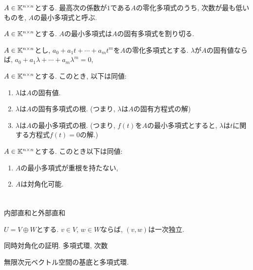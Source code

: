 \begin{definition}
$A\in\mathbb{K}^{n\times n}$とする.
最高次の係数が$1$である$A$の零化多項式のうち, 
次数が最も低いものを,
$A$の最小多項式と呼ぶ.
\end{definition}

\begin{cor}
$A\in\mathbb{K}^{n\times n}$とする.
$A$の最小多項式は$A$の固有多項式を割り切る.
\end{cor}
\begin{prop}
$A\in\mathbb{K}^{n\times n}$とし,
$a_0+a_1t+\cdots+a_mt^m$を$A$の零化多項式とする.
$\lambda$が$A$の固有値ならば,
$a_0+a_1\lambda+\cdots+a_m\lambda^m=0$,
\end{prop}
\begin{cor}
$A\in\mathbb{K}^{n\times n}$とする.
このとき, 以下は同値:
\begin{enumerate}
\item $\lambda$は$A$の固有値.
\item $\lambda$は$A$の固有多項式の根.
(つまり, $\lambda$は$A$の固有方程式の解)
\item $\lambda$は$A$の最小多項式の根.
(つまり, $f(t)$を$A$の最小多項式とすると,
$\lambda$は$t$に関する方程式$f(t)=0$の解.)
\end{enumerate}
\end{cor}

\begin{prop}
$A\in\mathbb{K}^{n\times n}$とする.
このとき以下は同値:
\begin{enumerate}
\item
$A$の最小多項式が重根を持たない,
\item
$A$は対角化可能.
\end{enumerate}
\end{prop}

\begin{quiz}
\end{quiz}




\chapter{}
\begin{quiz}
\end{quiz}





\chapter{}
内部直和と外部直和
\begin{prop}
  $U=V\oplus W$とする.
  $v\in V$, $w\in W$ならば,
  $(v,w)$は一次独立.
\end{prop}

同時対角化の証明.
多項式環, 次数

無限次元ベクトル空間の基底と多項式環.
